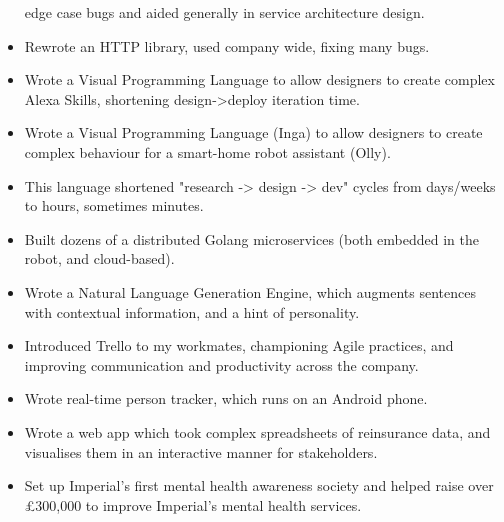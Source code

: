 \documentclass{jcgcv}
\begin{document}
\begin{column}
\begin{itemize}
          edge case bugs and aided generally in service architecture design.
    \item Rewrote an HTTP library, used company wide, fixing many bugs.
    \item Wrote a Visual Programming Language to allow designers to create
          complex Alexa Skills, shortening design->deploy iteration time.
  \end{itemize}
  \vgap
  \begin{itemize}\setlength\itemsep{0.25em}
    \item Wrote a Visual Programming Language (Inga) to allow designers to
          create complex behaviour for a smart-home robot assistant (Olly).
    \item This language shortened "research -> design -> dev" cycles from
          days/weeks to hours, sometimes minutes.
    \item Built dozens of a distributed Golang microservices
          (both embedded in the robot, and cloud-based).
    \item Wrote a Natural Language Generation Engine, which augments
          sentences with contextual information, and a hint of personality.
    \item Introduced Trello to my workmates, championing Agile practices,
          and improving communication and productivity across the company.
  \end{itemize}
  \vgap
  \begin{itemize}\setlength\itemsep{0.25em}
    \item Wrote real-time person tracker, which runs on an Android phone.
  \end{itemize}
  \vgap
  \begin{itemize}\setlength\itemsep{0.25em}
    \item Wrote a web app which took complex spreadsheets of reinsurance
          data, and visualises them in an interactive manner for stakeholders.
  \end{itemize}
  \vgap
  \begin{itemize}\setlength\itemsep{0.25em}
    \item Set up Imperial's first mental health awareness society and helped raise
          over \pounds300,000 to improve Imperial's mental health services.

\end{itemize}
\end{column}
\end{document}
